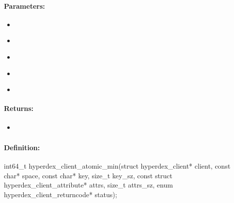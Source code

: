 \paragraph{Parameters:}
\begin{itemize}[noitemsep]
\item {}\\

\item {}\\

\item {}\\

\item {}\\

\item {}\\

\end{itemize}

\paragraph{Returns:}
\begin{itemize}[noitemsep]
\item {}\\

\end{itemize}

\pagebreak
\subsubsection{}
\label{api:c:atomic_min}


\paragraph{Definition:}
\begin{ccode}
int64_t hyperdex_client_atomic_min(struct hyperdex_client* client,
        const char* space,
        const char* key, size_t key_sz,
        const struct hyperdex_client_attribute* attrs, size_t attrs_sz,
        enum hyperdex_client_returncode* status);
\end{ccode}


